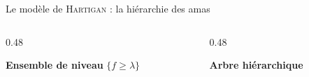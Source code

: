 \documentclass[A4,svgnames,9pt,aspectratio=169]{beamer}
\begin{document}
\begin{frame}{Le modèle de \textsc{Hartigan} : la hiérarchie des amas}
    \begin{columns}[onlytextwidth]
        \begin{column}{0.48\textwidth}
            \begin{center}
                \textbf{Ensemble de niveau} $\{f \ge \lambda\}$

                \vspace{0.3cm}
                
            \end{center}
        \end{column}
        \begin{column}{0.48\textwidth}
            \begin{center}
                \textcolor{inria-rouge}{\textbf{Arbre hiérarchique}}

                \vspace{0.3cm}
                
            \end{center}
        \end{column}
    \end{columns}
\end{frame}
\end{document}
